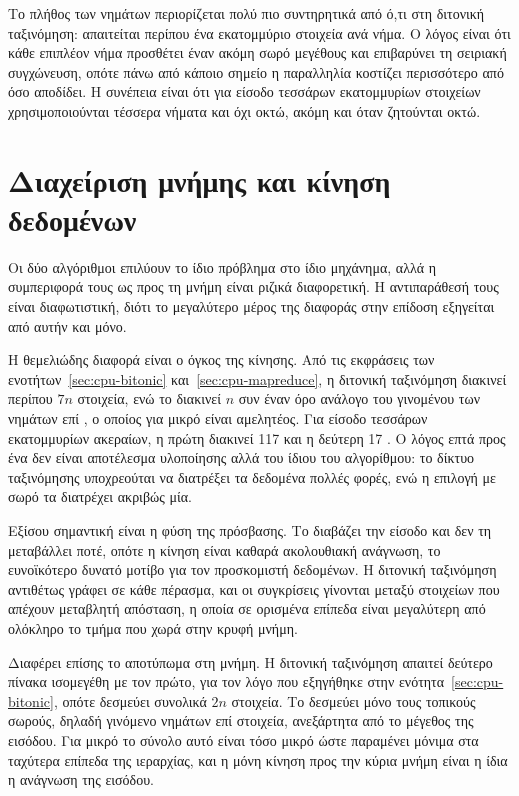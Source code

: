 Το πλήθος των νημάτων περιορίζεται πολύ πιο συντηρητικά από ό,τι στη διτονική
ταξινόμηση: απαιτείται περίπου ένα εκατομμύριο στοιχεία ανά νήμα. Ο λόγος είναι
ότι κάθε επιπλέον νήμα προσθέτει έναν ακόμη σωρό μεγέθους  και επιβαρύνει
τη σειριακή συγχώνευση, οπότε πάνω από κάποιο σημείο η παραλληλία κοστίζει
περισσότερο από όσο αποδίδει. Η συνέπεια είναι ότι για είσοδο τεσσάρων
εκατομμυρίων στοιχείων χρησιμοποιούνται τέσσερα νήματα και όχι οκτώ, ακόμη και
όταν ζητούνται οκτώ.

\section{Διαχείριση μνήμης και κίνηση δεδομένων}
\label{sec:cpu-memory}

Οι δύο αλγόριθμοι επιλύουν το ίδιο πρόβλημα στο ίδιο μηχάνημα, αλλά η
συμπεριφορά τους ως προς τη μνήμη είναι ριζικά διαφορετική. Η αντιπαράθεσή τους
είναι διαφωτιστική, διότι το μεγαλύτερο μέρος της διαφοράς στην επίδοση
εξηγείται από αυτήν και μόνο.

Η θεμελιώδης διαφορά είναι ο όγκος της κίνησης. Από τις εκφράσεις των
ενοτήτων~\ref{sec:cpu-bitonic} και~\ref{sec:cpu-mapreduce}, η διτονική
ταξινόμηση διακινεί περίπου $7n$ στοιχεία, ενώ το  διακινεί $n$
συν έναν όρο ανάλογο του γινομένου των νημάτων επί , ο οποίος για μικρό
 είναι αμελητέος. Για είσοδο τεσσάρων εκατομμυρίων ακεραίων, η πρώτη
διακινεί 117  και η δεύτερη 17 . Ο λόγος επτά προς ένα δεν είναι
αποτέλεσμα υλοποίησης αλλά του ίδιου του αλγορίθμου: το δίκτυο ταξινόμησης
υποχρεούται να διατρέξει τα δεδομένα πολλές φορές, ενώ η επιλογή με σωρό τα
διατρέχει ακριβώς μία.

Εξίσου σημαντική είναι η φύση της πρόσβασης. Το  διαβάζει την
είσοδο και δεν τη μεταβάλλει ποτέ, οπότε η κίνηση είναι καθαρά ακολουθιακή
ανάγνωση, το ευνοϊκότερο δυνατό μοτίβο για τον προσκομιστή δεδομένων. Η διτονική
ταξινόμηση αντιθέτως γράφει σε κάθε πέρασμα, και οι συγκρίσεις γίνονται μεταξύ
στοιχείων που απέχουν μεταβλητή απόσταση, η οποία σε ορισμένα επίπεδα είναι
μεγαλύτερη από ολόκληρο το τμήμα που χωρά στην κρυφή μνήμη.

Διαφέρει επίσης το αποτύπωμα στη μνήμη. Η διτονική ταξινόμηση απαιτεί δεύτερο
πίνακα ισομεγέθη με τον πρώτο, για τον λόγο που εξηγήθηκε στην
ενότητα~\ref{sec:cpu-bitonic}, οπότε δεσμεύει συνολικά $2n$ στοιχεία. Το
 δεσμεύει μόνο τους τοπικούς σωρούς, δηλαδή γινόμενο νημάτων επί
 στοιχεία, ανεξάρτητα από το μέγεθος της εισόδου. Για μικρό  το
σύνολο αυτό είναι τόσο μικρό ώστε παραμένει μόνιμα στα ταχύτερα επίπεδα της
ιεραρχίας, και η μόνη κίνηση προς την κύρια μνήμη είναι η ίδια η ανάγνωση της
εισόδου.

